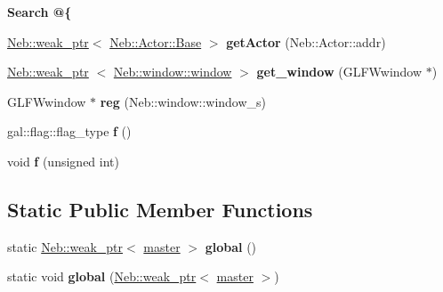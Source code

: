 \begin{Indent}{\bf \-Search @\{}\par
\begin{DoxyCompactItemize}
\item 
\hypertarget{classNeb_1_1master_a5e904cfb101128c317df8ae8909a76d0}{\hyperlink{classNeb_1_1weak__ptr}{\-Neb\-::weak\-\_\-ptr}$<$ \hyperlink{classNeb_1_1Actor_1_1Base}{\-Neb\-::\-Actor\-::\-Base} $>$ {\bfseries get\-Actor} (\-Neb\-::\-Actor\-::addr)}\label{classNeb_1_1master_a5e904cfb101128c317df8ae8909a76d0}

\item 
\hypertarget{classNeb_1_1master_a52f234f4ba1485910dc1590f7e0b8c33}{\hyperlink{classNeb_1_1weak__ptr}{\-Neb\-::weak\-\_\-ptr}\*
$<$ \hyperlink{classNeb_1_1window_1_1window}{\-Neb\-::window\-::window} $>$ {\bfseries get\-\_\-window} (\-G\-L\-F\-Wwindow $\ast$)}\label{classNeb_1_1master_a52f234f4ba1485910dc1590f7e0b8c33}

\item 
\hypertarget{classNeb_1_1master_a6548ef5ff871fec6dc28d3b3fa44c159}{\-G\-L\-F\-Wwindow $\ast$ {\bfseries reg} (\-Neb\-::window\-::window\-\_\-s)}\label{classNeb_1_1master_a6548ef5ff871fec6dc28d3b3fa44c159}

\item 
\hypertarget{classNeb_1_1master_a4ccf2ce1e6c39834544f2a015a7f2b7f}{gal\-::flag\-::flag\-\_\-type {\bfseries f} ()}\label{classNeb_1_1master_a4ccf2ce1e6c39834544f2a015a7f2b7f}

\item 
\hypertarget{classNeb_1_1master_aae9419e976bd48f05bbb86d820d30b95}{void {\bfseries f} (unsigned int)}\label{classNeb_1_1master_aae9419e976bd48f05bbb86d820d30b95}

\end{DoxyCompactItemize}
\end{Indent}
\subsection*{\-Static \-Public \-Member \-Functions}
\begin{DoxyCompactItemize}
\item 
\hypertarget{classNeb_1_1master_a7537ce2190a19fc5aa7d3cc505c33ad2}{static \hyperlink{classNeb_1_1weak__ptr}{\-Neb\-::weak\-\_\-ptr}$<$ \hyperlink{classNeb_1_1master}{master} $>$ {\bfseries global} ()}\label{classNeb_1_1master_a7537ce2190a19fc5aa7d3cc505c33ad2}

\item 
\hypertarget{classNeb_1_1master_a649f1435a3b08187a071f5759b5695b4}{static void {\bfseries global} (\hyperlink{classNeb_1_1weak__ptr}{\-Neb\-::weak\-\_\-ptr}$<$ \hyperlink{classNeb_1_1master}{master} $>$)}\label{classNeb_1_1master_a649f1435a3b08187a071f5759b5695b4}

\end{DoxyCompactItemize}
